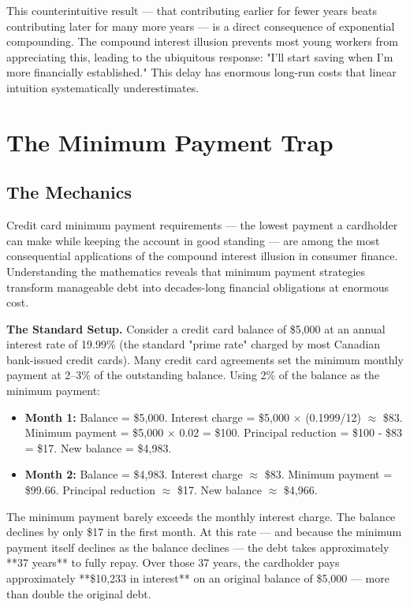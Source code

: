 \documentclass[12pt, letterpaper]{article}
\begin{document}
This counterintuitive result --- that contributing earlier for fewer years beats contributing later for many more years --- is a direct consequence of exponential compounding. The compound interest illusion prevents most young workers from appreciating this, leading to the ubiquitous response: "I'll start saving when I'm more financially established." This delay has enormous long-run costs that linear intuition systematically underestimates.

\medskip


\section{The Minimum Payment Trap}



\subsection{The Mechanics}


Credit card minimum payment requirements --- the lowest payment a cardholder can make while keeping the account in good standing --- are among the most consequential applications of the compound interest illusion in consumer finance. Understanding the mathematics reveals that minimum payment strategies transform manageable debt into decades-long financial obligations at enormous cost.

\textbf{The Standard Setup.} Consider a credit card balance of \$5,000 at an annual interest rate of 19.99\% (the standard "prime rate" charged by most Canadian bank-issued credit cards). Many credit card agreements set the minimum monthly payment at 2--3\% of the outstanding balance. Using 2\% of the balance as the minimum payment:

\begin{itemize}
\item \textbf{Month 1:} Balance = \$5,000. Interest charge = \$5,000 $\times$ (0.1999/12) $\approx$ \$83. Minimum payment = \$5,000 $\times$ 0.02 = \$100. Principal reduction = \$100 - \$83 = \$17. New balance = \$4,983.
\item \textbf{Month 2:} Balance = \$4,983. Interest charge $\approx$ \$83. Minimum payment = \$99.66. Principal reduction $\approx$ \$17. New balance $\approx$ \$4,966.
\end{itemize}

The minimum payment barely exceeds the monthly interest charge. The balance declines by only \$17 in the first month. At this rate --- and because the minimum payment itself declines as the balance declines --- the debt takes approximately **37 years** to fully repay. Over those 37 years, the cardholder pays approximately **\$10,233 in interest** on an original balance of \$5,000 --- more than double the original debt.
\end{document}
